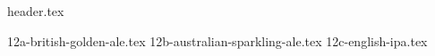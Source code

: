 \clearpage
{}
\divisorLine

{header.tex}

\begin{multicols}{2}

{12a-british-golden-ale.tex}
{12b-australian-sparkling-ale.tex}
{12c-english-ipa.tex}

\end{multicols}